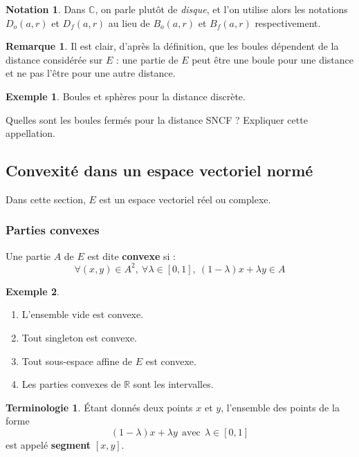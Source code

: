 \documentclass[french]{article}
\newcommand{\R}{\mathbb{R}}
\newcommand{\C}{\mathbb{C}}
\theoremstyle{plain}
\theoremstyle{definition}
\newtheorem*{ex}{Exemple}
\newtheorem*{rmq}{Remarque}
\newtheorem*{notation}{Notation}
\newtheorem*{terminologie}{Terminologie}
\theoremstyle{remark}
\begin{document}
\begin{notation} 
	Dans $\C$, on parle plutôt de \textit{disque}, et l'on utilise alors les notations $D_o(a,r)$ et $D_f(a,r)$ au lieu de $B_o(a,r)$ et $B_f(a,r)$ respectivement.
\end{notation}

\begin{rmq}
	Il est clair, d'après la définition, que les boules dépendent de la distance considérée sur $E$ : une partie de $E$ peut être une boule pour une distance et ne pas l'être pour une autre distance.
\end{rmq}

\begin{ex}
	Boules et sphères pour la distance discrète.
\end{ex}

\begin{exo}
	Quelles sont les boules fermés pour la distance SNCF ? Expliquer cette appellation.
\end{exo}

\subsection{Convexité dans un espace vectoriel normé}

Dans cette section, $E$ est un espace vectoriel réel ou complexe.

\subsubsection*{Parties convexes}

\begin{dfn}
	Une partie $A$ de $E$ est dite \textbf{convexe} si : $$\forall (x,y)\in A^2,\ \forall \lambda\in[0,1],\ (1-\lambda)x+\lambda y\in A$$
\end{dfn}

\begin{ex}
	\begin{enumerate}
		\item L'ensemble vide est convexe.
		\item Tout singleton est convexe.
		\item Tout sous-espace affine de $E$ est convexe.
		\item Les parties convexes de $\R$ sont les intervalles.
	\end{enumerate}
\end{ex}

\begin{terminologie}
	Étant donnés deux points $x$ et $y$,  l'ensemble des points de la forme $$(1-\lambda)x+\lambda y\ \ \text{avec}\ \ \lambda\in[0,1]$$ est appelé \textbf{segment} $[x,y]$.
\end{terminologie}
\end{document}
